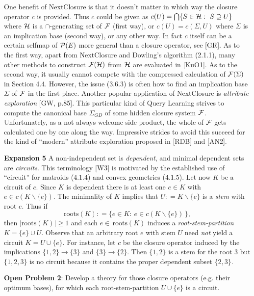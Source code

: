 \documentclass[11pt]{article}
\newcommand{\ra}{\rightarrow}
\begin{document}
One benefit of NextClosure is that it doesn't matter in which way the closure operator $c$ is provided. Thus $c$ could be given as $c(U) = \bigcap \{S \in {\cal H}: \ S \supseteq U\}$ where ${\cal H}$ is a $\cap$-generating set of ${\cal F}$ (first way), or $c(U) = c(\Sigma, U)$ where $\Sigma$ is an implication base (second way), or any other way. In fact $c$ itself can be a certain selfmap of ${\cal P}(E)$ more general than a closure operator, see [GR]. 
As to the first way, apart from NextClosure and Dowling's algorithm (2.1.1), many other methods to construct ${\cal F}({\cal H})$ from ${\cal H}$ are evaluated in [KuO1]. As to the second way, it usually cannot compete with the compressed calculation of ${\cal F}(\Sigma)$ in Section 4.4. However, the issue (3.6.3) is often how to find an implication base $\Sigma$ of ${\cal F}$ in the first place. Another popular application of NextClosure is {\it attribute exploration} [GW, p.85]. This particular kind of Query Learning strives to compute the canonical base $\Sigma_{GD}$ of some hidden closure system ${\cal F}$. Unfortunately, as a not always welcome side product, the whole of ${\cal F}$ gets calculated one by one along the way. Impressive strides to avoid this succeed for the kind of ``modern'' attribute exploration proposed in [RDB] and [AN2]. 



{\bf Expansion 5} A non-independent set is {\it dependent}, and minimal dependent sets are {\it circuits}. This terminology [W3] is motivated by the established use of ``circuit'' for matroids (4.1.4) and convex geometries (4.1.5). Let now $K$ be a circuit of $c$. Since $K$ is dependent there is at least one $e \in K$ with $e \in c(K\backslash \{e\})$. The minimality of $K$ implies that $U : = K\backslash \{e\}$ is a {\it stem} with root $e$. Thus if
$$\mbox{roots}(K) : = \{e \in K: \ e \in c(K \backslash \{e\})\, \},$$
then $|\mbox{roots}(K) | \geq 1$ and each $e \in \, \mbox{roots}(K)$ induces a {\it root-stem-partition} $K = \{e\} \cup U$. Observe that an arbitrary root $e$ with stem $U$ need {\it not} yield a circuit $K = U \cup \{e\}$. For instance, let $c$ be the closure operator induced by the implications $\{1,2\} \ra \{3\}$ and $\{3\} \ra \{2\}$. Then $\{1,2\}$ is a stem for the root $3$ but $\{1,2,3\}$ is no circuit because it contains the proper dependent subset $\{2,3\}$.

{\bf Open Problem 2}: Develop a theory for those closure operators (e.g. their optimum bases), for which each root-stem-partition $U \cup \{e\}$ is a circuit.
\end{document}
